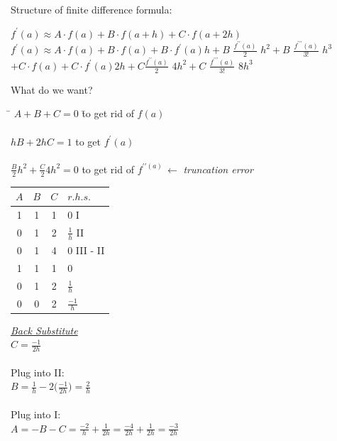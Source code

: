 \documentclass[a4paper,12pt]{report}
\begin{document}
	\noindent Structure of finite difference formula:
	
\begin{center}
	$f^\prime (a) \approx A \cdot f(a) + B \cdot  f(a+h) + C \cdot f(a+2h) $\\
	\bigskip
	$f^ \prime (a) \approx A \cdot f(a) + B \! \cdot \! f(a) + B \! \cdot \! f^\prime (a)h +B$ \large $\! \! \frac{f^{\prime \prime}(a)}{2} $
	\normalsize $h^2  + B$ \large $ \frac{ f^{\prime \prime \prime}(a)}{3!}$ \large $h^3$\\
	\medskip
	$+ C \cdot f(a) + C \cdot f^\prime (a)2h + C$\large $\frac{f^{\prime \prime}(a)}{2}$ \normalsize $4h^2 + C$
	\large $ \frac{ f^{\prime \prime \prime}(a)}{3!} $ \normalsize $\!\! 8h^3$
\end{center}

	\noindent What do we want?

\begin{tabbing}
	\hspace{4cm} \= $A + B + C = 0$ \hspace{5mm} \= to get rid of $f(a)$\\ \\
	\medskip
	\> $hB + 2hC =1$ \> to get $f^\prime(a)$\\ \\
	\>$\frac{B}{2}h^2 + \frac{C}{2}4h^2=0$ \> to get rid of $f^{\prime \prime(a)} \, \leftarrow$ \textit{truncation error}
\end{tabbing}

\vspace{5mm}

\begin{multicols}{2}	
\begin{center}
\begin{tabular}{ccc|l}
	$A$  &  $B$  &  $C$  &  $r.h.s.$\\
	\hline
	1 & 1 & 1 & 0 I\\
	0 & 1 & 2 & $\frac{1}{h}$ II\\
	0 & 1 & 4 & 0 III - II\\
	\hline
	1 & 1 & 1 & 0\\
	0 & 1 & 2 & $\frac{1}{h}$ \\
	0 & 0 & 2 & $\frac{-1}{h}$
\end{tabular}
\end{center}

	\noindent \underline{\textit{Back Substitute}}\\
	$C = \frac{-1}{2h}$\\
	\\
	Plug into II:\\
	$B = \frac{1}{h}-2 \big( \frac{-1}{2h} \big)= \frac{2}{h}$\\
	\\
	Plug into I: \\
	$A = -B - C = \frac{-2}{h} + \frac{1}{2h} = \frac{-4}{2h} + \frac{1}{2h}=\frac{-3}{2h}$
\end{multicols}
	
\end{document}
